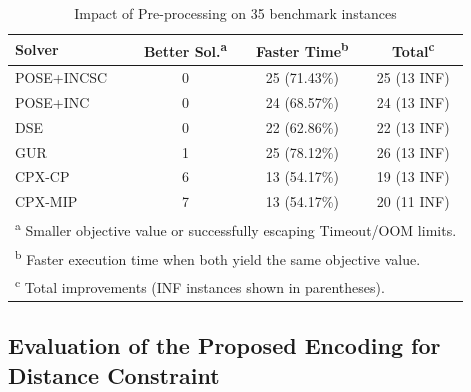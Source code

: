 \documentclass[letterpaper,journal]{IEEEtran}
\begin{document}
\begin{table}[H]
\centering
\caption{Impact of Pre-processing on 35 benchmark instances}
\label{tab:preprocess_stats}
\begin{tabular}{l|c|c|c}
\toprule
\textbf{Solver} & \textbf{Better Sol.\textsuperscript{a}} & \textbf{Faster Time\textsuperscript{b}} & \textbf{Total\textsuperscript{c}} \\ 
\midrule
POSE+INCSC & 0 & 25 (71.43\%) & 25 (13 INF) \\
POSE+INC   & 0 & 24 (68.57\%) & 24 (13 INF) \\
DSE        & 0 & 22 (62.86\%) & 22 (13 INF) \\
GUR        & 1 & 25 (78.12\%) & 26 (13 INF) \\
CPX-CP     & 6 & 13 (54.17\%) & 19 (13 INF) \\
CPX-MIP    & 7 & 13 (54.17\%) & 20 (11 INF) \\
\bottomrule
\multicolumn{4}{l}{\footnotesize \textsuperscript{a} Smaller objective value or successfully escaping Timeout/OOM limits.} \\
\multicolumn{4}{l}{\footnotesize \textsuperscript{b} Faster execution time when both yield the same objective value.} \\
\multicolumn{4}{l}{\footnotesize \textsuperscript{c} Total improvements (INF instances shown in parentheses).}
\end{tabular}
\end{table}



\subsection{Evaluation of the Proposed Encoding for Distance Constraint}
\end{document}
